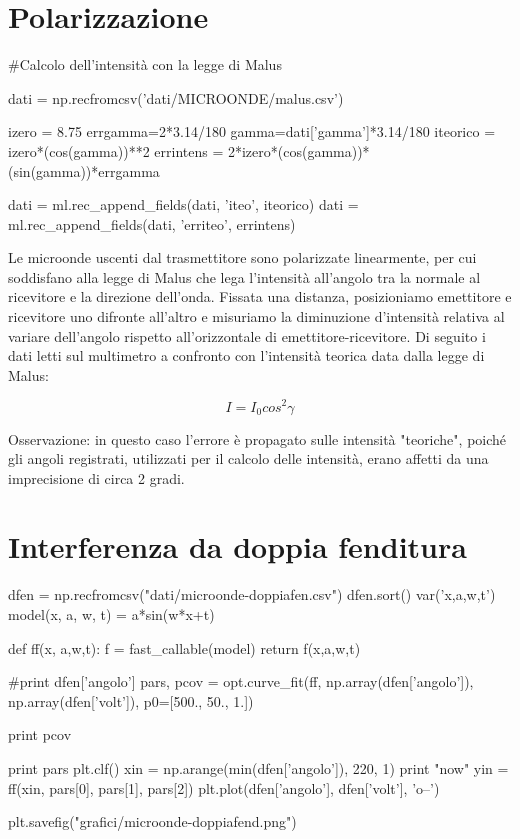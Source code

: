 
\section{Polarizzazione}

\begin{sagesilent}
#Calcolo dell'intensità con la legge di Malus

dati = np.recfromcsv('dati/MICROONDE/malus.csv')

izero = 8.75
errgamma=2*3.14/180
gamma=dati['gamma']*3.14/180
iteorico = izero*(cos(gamma))**2
errintens = 2*izero*(cos(gamma))*(sin(gamma))*errgamma

dati = ml.rec_append_fields(dati, 'iteo', iteorico)
dati = ml.rec_append_fields(dati, 'erriteo', errintens)

\end{sagesilent}


Le microonde uscenti dal trasmettitore sono polarizzate linearmente, per cui soddisfano alla legge di Malus che lega l'intensità all'angolo tra la normale al ricevitore e la direzione dell'onda. Fissata una distanza, posizioniamo emettitore e ricevitore uno difronte all'altro e misuriamo la diminuzione d'intensità relativa al variare dell'angolo rispetto all'orizzontale di emettitore-ricevitore. Di seguito i dati letti sul multimetro a confronto con l'intensità teorica data dalla legge di Malus:

\begin{equation}
I = I_{0} cos^2 \gamma
\end{equation}

\begin{center}
\end{center}

Osservazione: in questo caso l'errore è propagato sulle intensità "teoriche", poiché gli angoli registrati, utilizzati per il calcolo delle intensità, erano affetti da una imprecisione di circa 2 gradi.


\section{Interferenza da doppia fenditura}
\begin{sagesilent}
dfen = np.recfromcsv("dati/microonde-doppiafen.csv")
dfen.sort()
var('x,a,w,t')
model(x, a, w, t) = a*sin(w*x+t)

def ff(x, a,w,t):
  f = fast_callable(model)
  return f(x,a,w,t)

#print dfen['angolo']
pars, pcov = opt.curve_fit(ff, np.array(dfen['angolo']), np.array(dfen['volt']), p0=[500., 50., 1.])

print pcov

print pars
plt.clf()
xin = np.arange(min(dfen['angolo']), 220, 1)
print "now"
yin = ff(xin, pars[0], pars[1], pars[2])
plt.plot(dfen['angolo'], dfen['volt'], 'o--')

plt.savefig("grafici/microonde-doppiafend.png")
\end{sagesilent}


